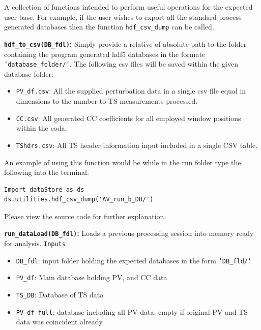 \documentclass{article}
\begin{document}
A collection of functions intended to perform useful operations for the expected user base. For example, if the user wishes to export all the standard process generated databases then the function \texttt{hdf\_csv\_dump} can be called. \newline


			\textbf{\texttt{hdf\_to\_csv(DB\_fdl)}:} \newline
	Simply provide a relative of absolute path to the folder containing the program generated hdf5 databases in the formate \texttt{'database\_folder/'}. The following csv files will be saved within the given database folder:
	
  \begin{itemize}
  \item \texttt{PV\_df.csv}: All the supplied perturbation data in a single csv file equal in dimensions to the number to TS measurements processed.
  \item \texttt{CC.csv}: All generated CC coefficients for all employed window positions within the coda. 
  \item \texttt{TShdrs.csv}: All TS header information input included in a single CSV table.
  \end{itemize}
  
  An example of using this function would be while in the run folder type the following into the terminal. 

\begin{lstlisting}[basicstyle=\small, frame=single]
Import dataStore as ds
ds.utilities.hdf_csv_dump('AV_run_b_DB/')

\end{lstlisting}

Please view the source code for further explanation. \newline

			\textbf{\texttt{run\_dataLoad(DB\_fdl)}:} \newline
			Loads a previous processing session into memory ready for analysis.
	\texttt{Inputs}
  \begin{itemize}
  \item \texttt{DB\_fdl}: input folder holding the expected databases in the form
                \texttt{'DB\_fld/'}
  \end{itemize}
  
  \begin{itemize}
  	\item  \texttt{PV\_df}: Main database holding PV, and CC data
  	\item  \texttt{TS\_DB}: Database of TS data
  	\item  \texttt{PV\_df\_full}: database including all PV data, empty if original PV and TS data was coincident already
  \end{itemize}
  
\end{document}
